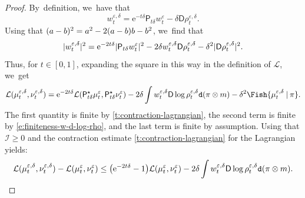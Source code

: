 \documentclass[JEP,XML,SOM,Unicode,published]{cedram}
\theoremstyle{definition}
\theoremstyle{remark}
\DeclarePairedDelimiter{\paren}{\lparen}{\rparen}
\DeclarePairedDelimiter{\abs}{\lvert}{\rvert}
\newcommand{\given}[1][]{%
\nonscript\:#1\vert
\allowbreak
\nonscript\:
\mathopen{}}
\begin{document}
\begin{proof}
By~definition, we~have that
\begin{equation*}
w_{t}^{\varepsilon, \delta} = \mathrm{e}^{-t\delta} \mathsf{P}_{t\delta} w_{t}^{\varepsilon} - \delta \mathsf{D} \rho^{\varepsilon,\delta}_{t}.
\end{equation*}
Using that $\paren{a-b}^{2} = a^{2} - 2(a-b)b - b^{2}$, we~find that
\begin{equation*}
\abs{w_{t}^{\varepsilon,\delta}}^{2} = \mathrm{e}^{-2t\delta} \abs{\mathsf{P}_{t\delta}w^{\varepsilon}_{t}}^{2} - 2 \delta w_{t}^{\varepsilon,\delta} \mathsf{D} \rho^{\varepsilon,\delta}_{t} - \delta^{2} \abs{\mathsf{D} \rho^{\varepsilon,\delta}_{t}}^{2}.
\end{equation*}
Thus, for $t \in [0,1]$, expanding the square in this way in the definition of $\mathcal{L}$, we~get
\begin{equation}\label{e:expansion-lagrangian}
\mathcal{L}(\mu^{\varepsilon,\delta}_{t}, \nu^{\varepsilon,\delta}_{t}) = \mathrm{e}^{-2t\delta} \mathcal{L}(\mathsf{P}_{t\delta}^{\star} \mu^{\varepsilon}_{t}, \mathsf{P}_{t\delta}^{\star}\nu^{\varepsilon}_{t}) - 2 \delta \int w_{t}^{\varepsilon, \delta} \mathsf{D} \log \rho^{\varepsilon,\delta}_{t} \mathtt{d} (\pi \otimes m) - \delta^{2} \Fish{ \mu^{\varepsilon,\delta}_{t} \given \pi }.
\end{equation}
The first quantity is finite by \cref{t:contraction-lagrangian}, the second term is finite by \cref{e:finiteness-w-d-log-rho}, and the last term is finite by assumption.
Using that $\mathcal{I} \geq 0$ and the contraction estimate \cref{t:contraction-lagrangian} for the Lagrangian yields:
\begin{equation}\label{e:difference-lagrangian}
\mathcal{L}(\mu^{\varepsilon,\delta}_{t}, \nu^{\varepsilon,\delta}_{t}) - \mathcal{L}(\mu^{\varepsilon}_{t}, \nu^{\varepsilon}_{t}) \leq \paren*{\mathrm{e}^{-2t\delta} -1} \mathcal{L}(\mu^{\varepsilon}_{t}, \nu^{\varepsilon}_{t}) - 2 \delta \int w^{\varepsilon,\delta}_{t} \mathsf{D} \log \rho^{\varepsilon,\delta}_{t} \mathtt{d} (\pi \otimes m).
\end{equation}


\end{proof}
\end{document}
